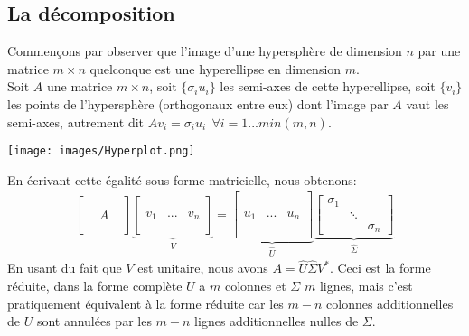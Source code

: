 \documentclass[11pt]{article}
\begin{document}
\subsection*{La décomposition}
Commençons par observer que l'image d'une hypersphère de dimension $n$ par une matrice $m \times n$ quelconque est une hyperellipse en dimension $m$.\\
Soit $A$ une matrice $m \times n$, soit $\{\sigma_iu_i\}$ les semi-axes de cette hyperellipse, soit $\{v_i\}$ les points de l'hypersphère (orthogonaux entre eux) dont l'image par $A$ vaut les semi-axes, autrement dit $Av_i = \sigma_iu_i ~~ \forall i = 1...min(m, n)$.\\
\begin{center}
	\texttt{[image: images/Hyperplot.png]}
\end{center}
En écrivant cette égalité sous forme matricielle, nous obtenons:
\begin{align*}
	\left[
		\begin{array}{ccc}
			&&\\&&\\&A&\\&&\\&&
		\end{array}
	\right]
	\underbrace{
	\left[
		\begin{array}{c|c|c}
			&&\\&&\\v_1&...&v_n\\&&\\&&
		\end{array}
	\right]}_{V}
	=
	\underbrace{
	\left[
		\begin{array}{c|c|c}
			&&\\&&\\&&\\u_1&...&u_n\\&&\\&&\\&&
		\end{array}
	\right]}_{\hat{U}}
	\underbrace{
	\left[
		\begin{array}{ccc}
			\sigma_1&&\\&\ddots&\\&&\sigma_n
		\end{array}
	\right]}_{\hat{\Sigma}}
\end{align*}
En usant du fait que $V$ est unitaire, nous avons $A = \hat{U}\hat{\Sigma}V^*$. Ceci est la forme réduite, dans la forme complète $U$ a $m$ colonnes et $\Sigma$ $m$ lignes, mais c'est pratiquement équivalent à la forme réduite car les $m-n$ colonnes additionnelles de $U$ sont annulées par les $m-n$ lignes additionnelles nulles de $\Sigma$.\\\\
\end{document}

